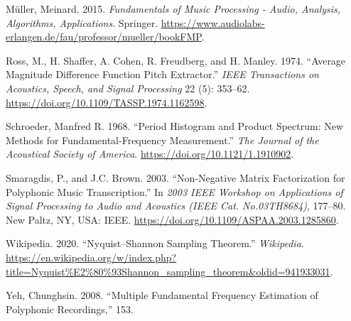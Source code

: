 \documentclass[american,]{article}
\begin{document}
\leavevmode\hypertarget{ref-muller_2015}{}%
Müller, Meinard. 2015. \emph{Fundamentals of Music Processing - Audio, Analysis, Algorithms, Applications}. Springer. \url{https://www.audiolabs-erlangen.de/fau/professor/mueller/bookFMP}.

\leavevmode\hypertarget{ref-ross_average_1974}{}%
Ross, M., H. Shaffer, A. Cohen, R. Freudberg, and H. Manley. 1974. ``Average Magnitude Difference Function Pitch Extractor.'' \emph{IEEE Transactions on Acoustics, Speech, and Signal Processing} 22 (5): 353--62. \url{https://doi.org/10.1109/TASSP.1974.1162598}.

\leavevmode\hypertarget{ref-schroeder_period_1968}{}%
Schroeder, Manfred R. 1968. ``Period Histogram and Product Spectrum: New Methods for Fundamental-Frequency Measurement.'' \emph{The Journal of the Acoustical Society of America}. \url{https://doi.org/10.1121/1.1910902}.

\leavevmode\hypertarget{ref-NNMF}{}%
Smaragdis, P., and J.C. Brown. 2003. ``Non-Negative Matrix Factorization for Polyphonic Music Transcription.'' In \emph{2003 IEEE Workshop on Applications of Signal Processing to Audio and Acoustics (IEEE Cat. No.03TH8684)}, 177--80. New Paltz, NY, USA: IEEE. \url{https://doi.org/10.1109/ASPAA.2003.1285860}.

\leavevmode\hypertarget{ref-wiki:nyquistshannon}{}%
Wikipedia. 2020. ``Nyquist--Shannon Sampling Theorem.'' \emph{Wikipedia}. \url{https://en.wikipedia.org/w/index.php?title=Nyquist\%E2\%80\%93Shannon_sampling_theorem\&oldid=941933031}.

\leavevmode\hypertarget{ref-yeh_thesis}{}%
Yeh, Chunghsin. 2008. ``Multiple Fundamental Frequency Estimation of Polyphonic Recordings,'' 153.
\end{document}
